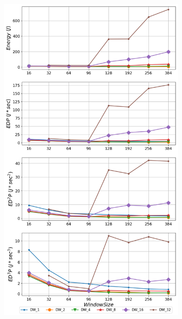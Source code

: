    \begin{minipage}{\textwidth}
      \begin{center}
         \\
         \vspace{3mm}
         \includegraphics[width=0.7\textwidth]{./graphs/edp/zeusmp.png}
         \vspace{6mm}
      \end{center}
   \end{minipage}

